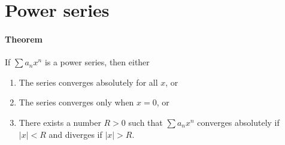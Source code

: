 \documentclass[a4paper,twocolumn,10pt]{article}
\begin{document}
  \section*{Power series}
  \paragraph{Theorem} If $\sum a_n x^n$ is a power series, then either
  \begin{enumerate}
    \item The series converges absolutely for all $x$, or
    \item The series converges only when $x=0$, or
    \item There exists a number $R>0$ such that $\sum a_n x^n$ converges
      absolutely if $|x| < R$ and diverges if $|x| > R$.
  \end{enumerate}
\end{document}
